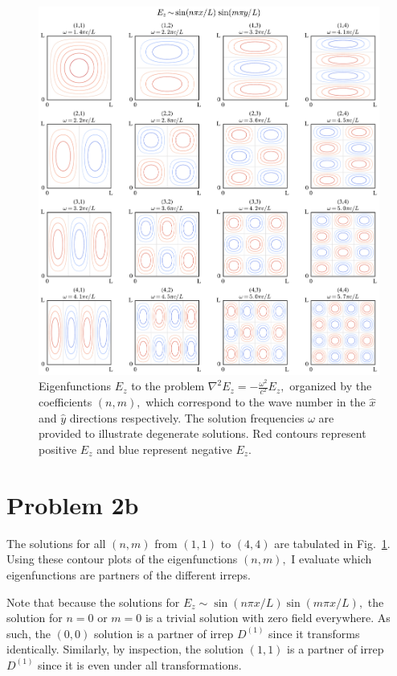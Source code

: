 \documentclass[aps,letterpaper,10pt]{article}
\newcommand{\D}[1]{ $D^{(#1)}$ }
\begin{document}
\begin{figure}[!h]
\centering
\includegraphics[width=\textwidth]{Soln.pdf}
\caption{\label{fig:all_soln} Eigenfunctions $E_z$ to the problem $\nabla^2 E_z = - \frac{\omega^2}{c^2} E_z,$ organized by the coefficients $(n,m),$ which correspond to the wave number in the $\hat{x}$ and $\hat{y}$ directions respectively. The solution frequencies $\omega$ are provided to illustrate degenerate solutions. Red contours represent positive $E_z$ and blue represent negative $E_z$.}
\end{figure}

\newpage
\section{Problem 2b}

The solutions for all $(n,m)$ from $(1,1)$ to $(4,4)$ are tabulated in Fig.~\ref{fig:all_soln}. Using these contour plots of the eigenfunctions $(n,m),$ I evaluate which eigenfunctions are partners of the different irreps. 

Note that because the solutions for $E_z \sim \sin(n \pi x / L)\sin(m\pi x/L),$ the solution for $n=0$ or $m=0$ is a trivial solution with zero field everywhere. As such, the $(0,0)$ solution is a partner of irrep \D1 since it transforms identically. Similarly, by inspection, the solution $(1,1)$ is a partner of irrep \D1 since it is even under all transformations. \\
\end{document}
